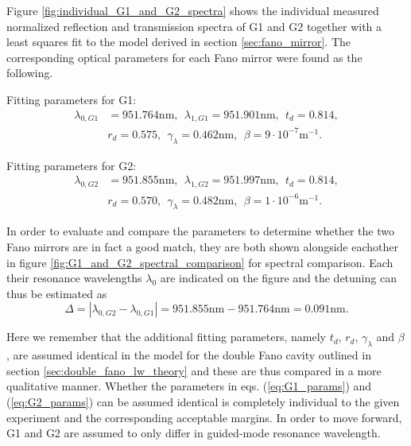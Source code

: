 Figure \ref{fig:individual_G1_and_G2_spectra} shows the individual measured normalized reflection and transmission spectra of G1 and G2 together with a least squares fit to the model derived in section \ref{sec:fano_mirror}. The corresponding optical parameters for each Fano mirror were found as the following.

Fitting parameters for G1:
\begin{equation}
    \begin{split}
        \lambda_{0,G1} &= 951.764 \text{nm}, \:\: \lambda_{1,G1} = 951.901 \text{nm},\:\: t_d = 0.814, \\&r_d = 0.575, \:\:  \gamma_{\lambda} = 0.462 \text{nm},\:\: \beta = 9 \cdot 10^{-7} \text{m}^{-1}.
    \end{split}
    \label{eq:G1_params}
\end{equation}

Fitting parameters for G2:
\begin{equation}
    \begin{split}
        \lambda_{0,G2} &= 951.855 \text{nm}, \:\: \lambda_{1,G2} = 951.997 \text{nm},\:\: t_d = 0.814, \\&r_d = 0.570, \:\:  \gamma_{\lambda} = 0.482 \text{nm},\:\: \beta = 1 \cdot 10^{-6} \text{m}^{-1}.
    \end{split}
    \label{eq:G2_params}
\end{equation}

In order to evaluate and compare the parameters to determine whether the two Fano mirrors are in fact a good match, they are both shown alongside eachother in figure \ref{fig:G1_and_G2_spectral_comparison} for spectral comparison. Each their resonance wavelengths $\lambda_0$ are indicated on the figure and the detuning can thus be estimated as 
\begin{equation}
    \Delta = \left|\lambda_{0,G2} - \lambda_{0,G1}\right| = 951.855 \text{nm} - 951.764 \text{nm} = 0.091 \text{nm}.
    \label{eq:G1/G2_detuning}
\end{equation}

Here we remember that the additional fitting parameters, namely $t_d$, $r_d$, $\gamma_{\lambda}$ and $\beta$, are assumed identical in the model for the double Fano cavity outlined in section \ref{sec:double_fano_lw_theory} and these are thus compared in a more qualitative manner. Whether the parameters in eqs. (\ref{eq:G1_params}) and (\ref{eq:G2_params}) can be assumed identical is completely individual to the given experiment and the corresponding acceptable margins. In order to move forward, G1 and G2 are assumed to only differ in guided-mode resonance wavelength.


